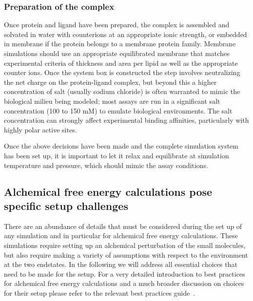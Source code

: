 \documentclass[9pt,bestpractices]{livecoms}
\begin{document}
\subsubsection{Preparation of the complex}

Once protein and ligand have been prepared, the complex is assembled and solvated in water with counterions at an appropriate ionic strength, or embedded in membrane if the protein belongs to a membrane protein family. Membrane simulations should use an appropriate equilibrated membrane that matches experimental criteria of thickness and area per lipid as well as the appropriate counter ions. Once the system box is constructed the step involves neutralizing the net charge on the protein-ligand complex, but beyond this a higher concentration of salt (usually sodium chloride) is often warranted to mimic the biological milieu being modeled; most assays are run in a significant salt concentration (100 to 150 mM) to emulate biological environments. The salt concentration can strongly affect experimental binding affinities, particularly with highly polar active sites.

Once the above decisions have been made and the complete simulation system has been set up, it is important to let it relax and equilibrate at simulation temperature and pressure, which should mimic the assay conditions.

\subsection{Alchemical free energy calculations pose specific setup challenges}
\label{sec:alchemical_prep}

There are an abundance of details that must be considered during the set up of any simulation and in particular for alchemical free energy calculations. These simulations require setting up an alchemical perturbation of the small molecules, but also require making a variety of  assumptions with respect to the environment at the two endstates. In the following we will address all essential choices that need to be made for the setup. For a very detailed introduction to best practices for alchemical free energy calculations and a much broader discussion on choices for their setup please refer to the relevant best practices guide~\cite{meyBestPracticesAlchemical2020}. 
\end{document}
